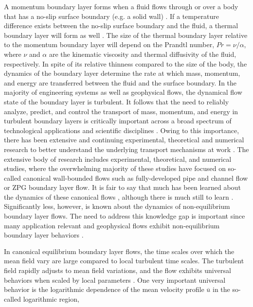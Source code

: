 A momentum boundary layer forms when a fluid flows through or over a body that has a no-slip surface boundary (e.g. a solid wall) \cite{prandtl1908}. If a temperature difference exists between the no-slip surface boundary and the fluid, a thermal boundary layer will form as well \cite{Kays1980}. The size of the thermal boundary layer relative to the momentum boundary layer will depend on the Prandtl number, $Pr = \nu/\alpha$, where $\nu$ and $\alpha$ are the kinematic viscosity and thermal diffusivity of the fluid, respectively. In spite of its relative thinness compared to the size of the body, the dynamics of the boundary layer determine the rate at which mass, momentum, and energy are transferred between the fluid and the surface boundary. In the majority of engineering systems as well as geophysical flows, the dynamical flow state of the boundary layer is turbulent.  It follows that the need to reliably analyze, predict, and control the transport of mass, momentum, and energy in turbulent boundary layers is critically important across a broad spectrum of technological applications and scientific disciplines \cite{Fox2012}. Owing to this importance, there has been extensive and continuing experimental, theoretical and numerical research to better understand the underlying transport mechanisms at work \cite{Clauser1956}. The extensive body of research includes experimental, theoretical, and numerical studies, where the overwhelming majority of these studies have focused on so-called canonical wall-bounded flows such as fully-developed pipe and channel flow or ZPG boundary layer flow. It is fair to say that much has been learned about the dynamics of these canonical flows \cite{Sreenivasan1997}, although there is much still to learn \cite{Sreenivasan1999, Jimenez2012}. Significantly less, however, is known about the dynamics of non-equilibrium boundary layer flows. The need to address this knowledge gap is important since many application relevant and geophysical flows exhibit non-equilibrium boundary layer behaviors \cite{Hara2009}.

In canonical equilibrium boundary layer flows, the time scales over which the mean field vary are large compared to local turbulent time scales. The turbulent field rapidly adjusts to mean field variations, and the flow exhibits universal behaviors when scaled by local parameters \cite{townsend1976}. One very important universal behavior is the logarithmic dependence of the mean velocity profile $\overline{u}$ in the so-called logarithmic region,


